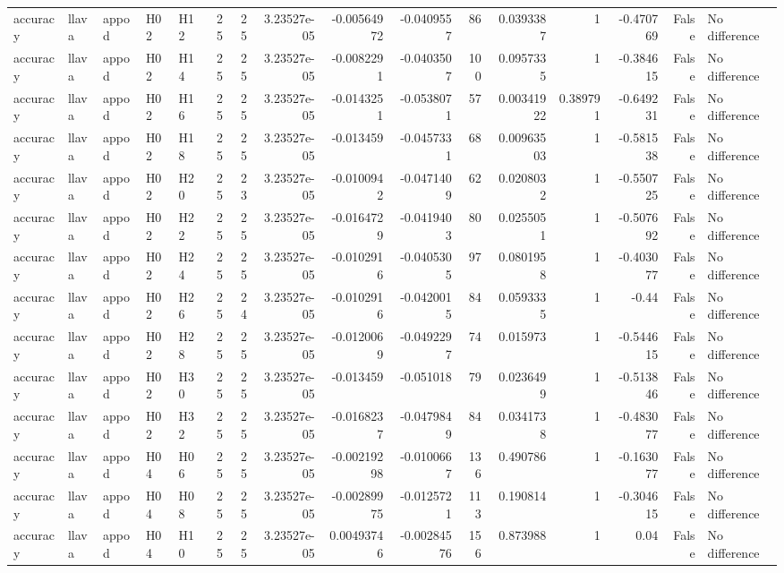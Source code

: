\begin{longtable}{lllllrrrrrrrrrrl}
accuracy & llava & appod & H02 & H12 & 25 & 25 & 3.23527e-05 & -0.00564972 & -0.0409557 & 86 & 0.0393387 & 1 & -0.470769 & False & No difference \\
accuracy & llava & appod & H02 & H14 & 25 & 25 & 3.23527e-05 & -0.0082291 & -0.0403507 & 100 & 0.0957335 & 1 & -0.384615 & False & No difference \\
accuracy & llava & appod & H02 & H16 & 25 & 25 & 3.23527e-05 & -0.0143251 & -0.0538071 & 57 & 0.00341922 & 0.389791 & -0.649231 & False & No difference \\
accuracy & llava & appod & H02 & H18 & 25 & 25 & 3.23527e-05 & -0.013459 & -0.0457331 & 68 & 0.00963503 & 1 & -0.581538 & False & No difference \\
accuracy & llava & appod & H02 & H20 & 25 & 23 & 3.23527e-05 & -0.0100942 & -0.0471409 & 62 & 0.0208032 & 1 & -0.550725 & False & No difference \\
accuracy & llava & appod & H02 & H22 & 25 & 25 & 3.23527e-05 & -0.0164729 & -0.0419403 & 80 & 0.0255051 & 1 & -0.507692 & False & No difference \\
accuracy & llava & appod & H02 & H24 & 25 & 25 & 3.23527e-05 & -0.0102916 & -0.0405305 & 97 & 0.0801958 & 1 & -0.403077 & False & No difference \\
accuracy & llava & appod & H02 & H26 & 25 & 24 & 3.23527e-05 & -0.0102916 & -0.0420015 & 84 & 0.0593335 & 1 & -0.44 & False & No difference \\
accuracy & llava & appod & H02 & H28 & 25 & 25 & 3.23527e-05 & -0.0120069 & -0.0492297 & 74 & 0.015973 & 1 & -0.544615 & False & No difference \\
accuracy & llava & appod & H02 & H30 & 25 & 25 & 3.23527e-05 & -0.013459 & -0.051018 & 79 & 0.0236499 & 1 & -0.513846 & False & No difference \\
accuracy & llava & appod & H02 & H32 & 25 & 25 & 3.23527e-05 & -0.0168237 & -0.0479849 & 84 & 0.0341738 & 1 & -0.483077 & False & No difference \\
accuracy & llava & appod & H04 & H06 & 25 & 25 & 3.23527e-05 & -0.00219298 & -0.0100667 & 136 & 0.490786 & 1 & -0.163077 & False & No difference \\
accuracy & llava & appod & H04 & H08 & 25 & 25 & 3.23527e-05 & -0.00289975 & -0.0125721 & 113 & 0.190814 & 1 & -0.304615 & False & No difference \\
accuracy & llava & appod & H04 & H10 & 25 & 25 & 3.23527e-05 & 0.00493746 & -0.00284576 & 156 & 0.873988 & 1 & 0.04 & False & No difference \\

\end{longtable}
